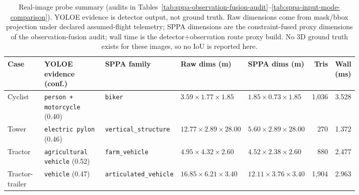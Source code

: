 \documentclass[10pt]{article}
\begin{document}
\begin{table}[H]
\centering
\scriptsize
\setlength{\tabcolsep}{3pt}
\renewcommand{\arraystretch}{1.08}
\caption{Real-image probe summary (audits in
Tables~\ref{tab:sppa-observation-fusion-audit}--\ref{tab:sppa-input-mode-comparison}).
YOLOE evidence is detector output, not ground truth. Raw
dimensions come from mask/bbox projection under declared assumed-flight
telemetry; SPPA dimensions are the constraint-fused proxy dimensions of the
observation-fusion audit; wall time is the detector+observation route proxy
build. No 3D ground truth exists for these images, so no IoU is reported
here.}
\label{tab:real-probe-summary}
\begin{tabularx}{\linewidth}{@{}L{0.12\linewidth}L{0.21\linewidth}L{0.16\linewidth}L{0.16\linewidth}L{0.16\linewidth}r r@{}}
\toprule
Case & YOLOE evidence (conf.) & SPPA family & Raw dims (m) & SPPA dims (m) & Tris & Wall (ms) \\
\midrule
Cyclist & \texttt{person + motorcycle} (0.40) & \texttt{biker} & \(3.59\times1.77\times1.85\) & \(1.85\times0.73\times1.85\) & 1,036 & 3.528 \\
Tower & \texttt{electric pylon} (0.46) & \texttt{vertical\_structure} & \(12.77\times2.89\times28.00\) & \(5.60\times2.89\times28.00\) & 270 & 1.372 \\
Tractor & \texttt{agricultural vehicle} (0.52) & \texttt{farm\_vehicle} & \(4.95\times4.32\times2.60\) & \(4.52\times2.38\times2.60\) & 880 & 2.477 \\
Tractor-trailer & \texttt{vehicle} (0.47) & \texttt{articulated\_vehicle} & \(16.85\times6.21\times3.40\) & \(12.11\times3.76\times3.40\) & 1,904 & 2.963 \\
\bottomrule
\end{tabularx}
\end{table}
\end{document}
